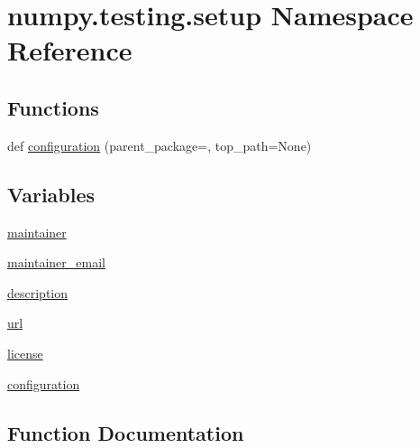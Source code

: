 \hypertarget{namespacenumpy_1_1testing_1_1setup}{}\section{numpy.\+testing.\+setup Namespace Reference}
\label{namespacenumpy_1_1testing_1_1setup}
\subsection*{Functions}
\begin{DoxyCompactItemize}
\item 
def \hyperlink{namespacenumpy_1_1testing_1_1setup_a9ae7c4c489a407d3f4fc217187a69ef8}{configuration} (parent\+\_\+package=\textquotesingle{}\textquotesingle{}, top\+\_\+path=None)
\end{DoxyCompactItemize}
\subsection*{Variables}
\begin{DoxyCompactItemize}
\item 
\hyperlink{namespacenumpy_1_1testing_1_1setup_a56c39a182e29b204b75bc8a2f81be3aa}{maintainer}
\item 
\hyperlink{namespacenumpy_1_1testing_1_1setup_aa936470c10d0c250987461b36f6278d9}{maintainer\+\_\+email}
\item 
\hyperlink{namespacenumpy_1_1testing_1_1setup_a46cee35eaf078457ab26732b4216fc05}{description}
\item 
\hyperlink{namespacenumpy_1_1testing_1_1setup_a58c572ede8755c59383f47c51fd171b1}{url}
\item 
\hyperlink{namespacenumpy_1_1testing_1_1setup_aa9b3aa24c3632d739156ec36926f3e78}{license}
\item 
\hyperlink{namespacenumpy_1_1testing_1_1setup_a85a4f981a82e7d5cb7e082bd5f55b31d}{configuration}
\end{DoxyCompactItemize}


\subsection{Function Documentation}
\mbox{\label{namespacenumpy_1_1testing_1_1setup_a9ae7c4c489a407d3f4fc217187a69ef8}} 
